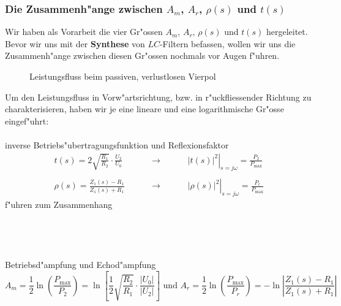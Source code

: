 \subsubsection{Die Zusammenh"ange zwischen {\boldmath $A_m$, $A_r$, $\rho(s)$ und $t(s)$}}
Wir haben als Vorarbeit die vier Gr"ossen $A_m$, $A_r$,
$\rho(s)$ und $t(s)$ hergeleitet.  Bevor wir uns mit der {\bf Synthese} von $LC$-Filtern befassen, wollen wir uns die Zusammenh"ange zwischen diesen
Gr"ossen nochmals vor Augen f"uhren.
\begin{figure}[!htb]
\begin{center}
  \caption{Leistungsfluss beim passiven, verlustlosen Vierpol}
\end{center}
\vspace*{-6mm}
\end{figure}
Um den Leistungsfluss in Vorw"artsrichtung, bzw. in r"uckfliessender Richtung
zu charakterisieren, haben wir je eine lineare und eine logarithmische
Gr"osse eingef"uhrt:\\
\\
\nit inverse Betriebs"ubertragungsfunktion und Reflexionsfaktor
\begin{eqnarray*}
  t(s)=2 \sqrt{\frac{R_1}{R_2}} \cdot \frac{U_2}{U_0} 
  \hspace{1cm} &\longrightarrow& \hspace{1cm}
  \left. |t(s)|^2 \right|_{s=j\omega}=\frac{P_2}{P_{\max}} \\
  \\
  \rho(s)=\frac{Z_1(s)-R_1}{Z_1(s) + R_1} 
  \hspace{1cm} &\longrightarrow& \hspace{1cm}
  \left. |\rho(s)|^2 \right|_{s=j\omega}=\frac{P_r}{P_{\max}}
\end{eqnarray*}
f"uhren zum Zusammenhang\\~~\\
\\~~\\
\\
\nit Betriebsd"ampfung und Echod"ampfung
\begin{equation*}
A_m=\frac{1}{2} \ln{\left(\frac{P_{\max}}{P_2}\right)} 
=\ln{ \left[ \frac{1}{2} \sqrt{\frac{R_2}{R_1}} \cdot \frac{\left| U_0 
\right|}{\left| U_2 \right|} \right]}\text{  und  }A_r=\frac{1}{2} \ln{\left(\frac{P_{\max}}{P_r}\right)} 
=-\ln{ \left| \frac{Z_1(s)-R_1}{Z_1(s) + R_1} \right|}
\end{equation*}
